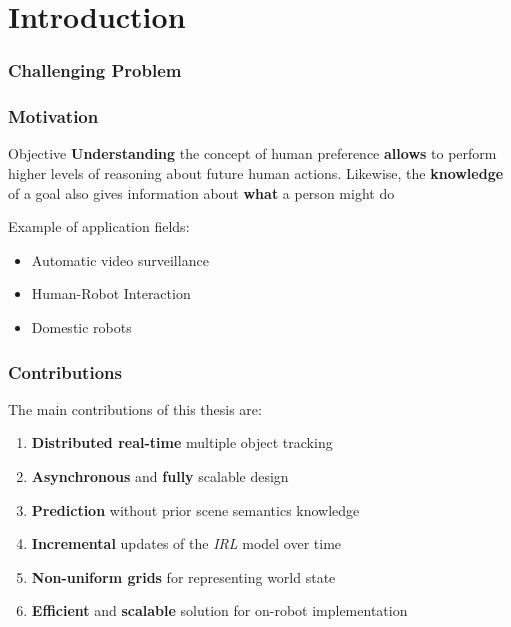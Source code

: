 \section{Introduction}

\begin{frame}
	\frametitle{Challenging Problem}
	
	\begin{center}
	\end{center}
\end{frame}

\begin{frame}
	\frametitle{Motivation}
	
	\vspace{0.2cm}
	
	\Large
	
	\begin{block}{Objective}
		\textbf{Understanding} the concept of human preference \textbf{allows} to perform higher levels
		of reasoning about future human actions. Likewise, the \textbf{knowledge} of a goal also gives
		information about \textbf{what} a person might do
	\end{block}
	
	\vspace{0.3cm}
	
	Example of application fields:
	\begin{itemize}
		\item Automatic video surveillance
		\item Human-Robot Interaction
		\item Domestic robots
	\end{itemize}
\end{frame}

\begin{frame}
	\frametitle{Contributions}
	
	\Large
	
	The main contributions of this thesis are:
	
	\begin{enumerate}
		\item \textbf{Distributed real-time} multiple object tracking
		\item \textbf{Asynchronous} and \textbf{fully} scalable design
		\item \textbf{Prediction} without prior scene semantics knowledge
		\item \textbf{Incremental} updates of the \emph{IRL} model over time
		\item \textbf{Non-uniform grids} for representing world state
		\item \textbf{Efficient} and \textbf{scalable} solution for on-robot implementation
	\end{enumerate}
\end{frame}

